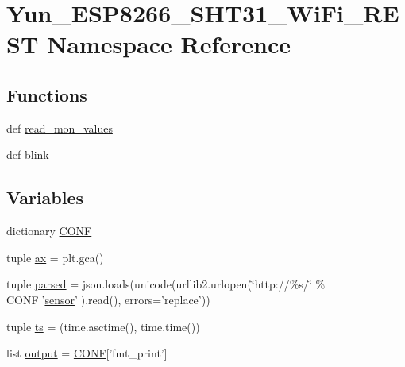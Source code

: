 \hypertarget{namespaceYun__ESP8266__SHT31__WiFi__REST}{\section{Yun\-\_\-\-E\-S\-P8266\-\_\-\-S\-H\-T31\-\_\-\-Wi\-Fi\-\_\-\-R\-E\-S\-T Namespace Reference}
\label{namespaceYun__ESP8266__SHT31__WiFi__REST}
}
\subsection*{Functions}
\begin{DoxyCompactItemize}
\item 
def \hyperlink{namespaceYun__ESP8266__SHT31__WiFi__REST_a8847b2476110503adebd4cea70d12f5d}{read\-\_\-mon\-\_\-values}
\item 
def \hyperlink{namespaceYun__ESP8266__SHT31__WiFi__REST_afe6d2e7a279452543e18afc34d1e3114}{blink}
\end{DoxyCompactItemize}
\subsection*{Variables}
\begin{DoxyCompactItemize}
\item 
dictionary \hyperlink{namespaceYun__ESP8266__SHT31__WiFi__REST_a8d61ec095672a28e3d0baecb0c409e29}{C\-O\-N\-F}
\item 
tuple \hyperlink{namespaceYun__ESP8266__SHT31__WiFi__REST_a0e6142681b435132cacefd1f0c8e32bf}{ax} = plt.\-gca()
\item 
tuple \hyperlink{namespaceYun__ESP8266__SHT31__WiFi__REST_a46b22ae14dfeb87a7f7a7d7a2bbe79ab}{parsed} = json.\-loads(unicode(urllib2.\-urlopen(\char`\"{}http\-://\%s/\char`\"{} \% C\-O\-N\-F\mbox{[}'\hyperlink{Tiny__OWSlave__OWH__DS18B20__thermo-hygrometer_8ino_abdb2aa4e7ca4f99842081342ca9d8830}{sensor}'\mbox{]}).read(), errors='replace'))
\item 
tuple \hyperlink{namespaceYun__ESP8266__SHT31__WiFi__REST_a7770630e75551836c5d8dc48c3321a6a}{ts} = (time.\-asctime(), time.\-time())
\item 
list \hyperlink{namespaceYun__ESP8266__SHT31__WiFi__REST_acb18c36bfe11f9d6ae35ec9914ff386f}{output} = \hyperlink{namespaceYun__ESP8266__SHT31__WiFi__REST_a8d61ec095672a28e3d0baecb0c409e29}{C\-O\-N\-F}\mbox{[}'fmt\-\_\-print'\mbox{]}
\end{DoxyCompactItemize}


